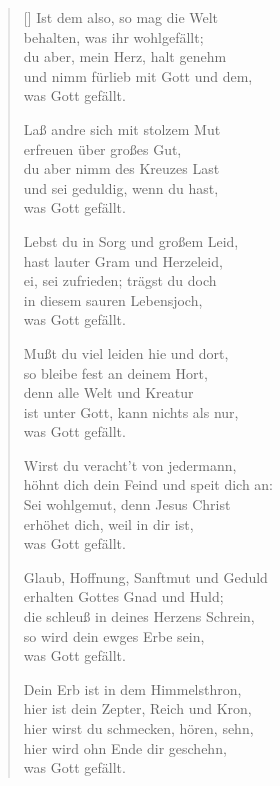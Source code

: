 \begin{multicols}{2}
\begin{verse}[\versewidth]
 Ist dem also, so mag die Welt\\
behalten, was ihr wohlgefällt;\\
du aber, mein Herz, halt genehm\\
und nimm fürlieb mit Gott und dem,\\
was Gott gefällt.

 Laß andre sich mit stolzem Mut\\
erfreuen über großes Gut,\\
du aber nimm des Kreuzes Last\\
und sei geduldig, wenn du hast,\\
was Gott gefällt.

 Lebst du in Sorg und großem Leid,\\
hast lauter Gram und Herzeleid,\\
ei, sei zufrieden; trägst du doch\\
in diesem sauren Lebensjoch,\\
was Gott gefällt.

 Mußt du viel leiden hie und dort,\\
so bleibe fest an deinem Hort,\\
denn alle Welt und Kreatur\\
ist unter Gott, kann nichts als nur,\\
was Gott gefällt.

 Wirst du veracht't von jedermann,\\
höhnt dich dein Feind und speit dich an:\\
Sei wohlgemut, denn Jesus Christ\\
erhöhet dich, weil in dir ist,\\
was Gott gefällt.

 Glaub, Hoffnung, Sanftmut und Geduld\\
erhalten Gottes Gnad und Huld;\\
die schleuß in deines Herzens Schrein,\\
so wird dein ewges Erbe sein,\\
was Gott gefällt.

 Dein Erb ist in dem Himmelsthron,\\
hier ist dein Zepter, Reich und Kron,\\
hier wirst du schmecken, hören, sehn,\\
hier wird ohn Ende dir geschehn,\\
was Gott gefällt.

\end{verse}
\end{multicols}
